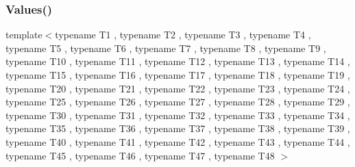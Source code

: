 \mbox{\label{namespacetesting_af3cdf373b137d357bb3a814c097bcd06}} 
\subsubsection{\texorpdfstring{Values()}{Values()}\hspace{0.1cm}{\footnotesize\ttfamily [48/50]}}
{\footnotesize\ttfamily template$<$typename T1 , typename T2 , typename T3 , typename T4 , typename T5 , typename T6 , typename T7 , typename T8 , typename T9 , typename T10 , typename T11 , typename T12 , typename T13 , typename T14 , typename T15 , typename T16 , typename T17 , typename T18 , typename T19 , typename T20 , typename T21 , typename T22 , typename T23 , typename T24 , typename T25 , typename T26 , typename T27 , typename T28 , typename T29 , typename T30 , typename T31 , typename T32 , typename T33 , typename T34 , typename T35 , typename T36 , typename T37 , typename T38 , typename T39 , typename T40 , typename T41 , typename T42 , typename T43 , typename T44 , typename T45 , typename T46 , typename T47 , typename T48 $>$ \\
}
